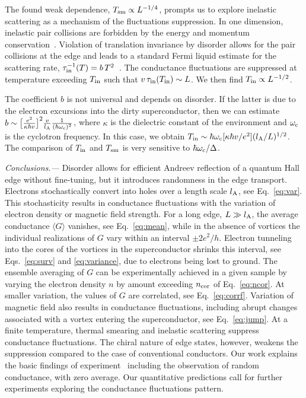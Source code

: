 \documentclass[reprint,
superscriptaddress,
amsmath,
amssymb,
aps,
prl,
floatfix,
english
]{revtex4-2}
\newcommand{\lprox}{L}
\newcommand{\lA}{l_{\rm A}}
\begin{document}
The found weak dependence, $T_{\rm sm} \propto L^{-1/4}$, prompts us to explore inelastic scattering as a mechanism of the fluctuations suppression.
In one dimension, inelastic pair collisions are forbidden by the energy and momentum conservation~\cite{imambekov2012}.
Violation of translation invariance by disorder allows for the pair collisions at the edge and leads to a standard Fermi liquid estimate for the scattering rate, $\tau_{\rm in}^{-1}(T) = b\,T^2$~\cite{kane1995}.
The conductance fluctuations are suppressed at temperature exceeding $T_{\rm in}$ such that $v\,\tau_{\rm in}(T_{\rm in}) \sim L$.
We then find $T_{\rm in} \propto L^{-1/2}$.

The coefficient $b$ is not universal and depends on disorder. If the latter is due to the electron excursions into the dirty superconductor, then we can estimate $b \sim \big[\frac{e^2}{\kappa \hbar v}\big]^2 \frac{v}{\lA} \frac{1}{(\hbar \omega_{\rm c})^{2}}$,
where $\kappa$ is the dielectric constant of the environment and $\omega_{\rm c}$ is the cyclotron frequency. In this case, we obtain $T_{\rm in} \sim \hbar \omega_{\rm c} [\kappa \hbar v / e^2] (\lA/\lprox)^{1/2}$. The comparison of $T_{\rm in}$ and $T_{\rm sm}$ is very sensitive to $\hbar \omega_{\rm c} / \Delta$.

\textit{Conclusions.---}
Disorder allows for efficient Andreev reflection of a quantum Hall edge without fine-tuning, but it
introduces randomness in the edge transport.
Electrons stochastically convert into holes over a
length scale $l_{\rm A}$, see Eq.~\eqref{eq:var}.
This stochasticity 
results in conductance fluctuations with the variation of electron density or magnetic field strength. For a long edge, $\lprox \gg \lA$, the
average conductance $\langle G \rangle$ vanishes, see Eq.~\eqref{eq:mean}, while in the absence of vortices the individual realizations of $G$ vary within an interval $\pm 2e^2/h$. 
Electron tunneling into the cores of the vortices in the superconductor shrinks this interval, see Eqs.~\eqref{eq:surv} and \eqref{eq:variance}, due to electrons being lost to ground.
The ensemble averaging of $G$ can be experimentally achieved in a given sample by varying the electron density $n$ by amount exceeding $n_{\rm cor}$ of Eq.~\eqref{eq:ncor}. At smaller variation, the values of $G$ are correlated, see Eq.~\eqref{eq:corrf}. Variation of magnetic field also results in conductance fluctuations, including abrupt changes associated with a vortex entering the superconductor, see Eq.~\eqref{eq:jump}. At a finite temperature, thermal smearing and inelastic scattering suppress conductance fluctuations.
The chiral nature of edge states, however, weakens the suppression compared to the case of conventional conductors.
Our work explains the basic findings of experiment~\cite{zhao2020} including the observation of random conductance, with zero average. Our quantitative predictions call for further experiments exploring the conductance fluctuations pattern. 
\end{document}
